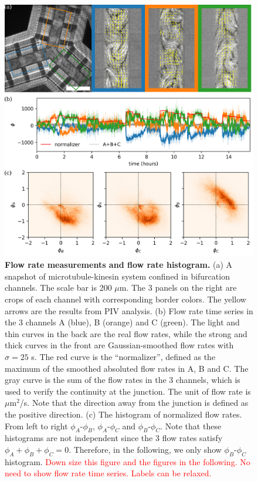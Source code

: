 \documentclass[%
10pt,
superscriptaddress,
twocolumn,
 amsmath,amssymb,
 aps,prx,
]{revtex4-2}
\begin{document}
\begin{figure}[!h]
    \includegraphics[width=\textwidth]{3-bifurcation-symmetric}
    \caption{
    \textbf{Flow rate measurements and flow rate histogram.}
    (a) A snapshot of microtubule-kinesin system confined in bifurcation channels.
    The scale bar is 200 $\mu$m.
    The 3 panels on the right are crops of each channel with corresponding border colors. 
    The yellow arrows are the results from PIV analysis. 
    (b) Flow rate time series in the 3 channels A (blue), B (orange) and C (green). 
    The light and thin curves in the back are the real flow rates, while the strong and thick curves in the front are Gaussian-smoothed flow rates with $\sigma=25$ s. 
    The red curve is the ``normalizer'', defined as the maximum of the   smoothed absoluted flow rates in A, B and C. 
    The gray curve is the sum of the flow rates in the 3 channels, which is used to verify the continuity at the junction.
    The unit of flow rate is $\mu$m$^2$/s.
    Note that the direction away from the junction is defined as the positive direction. 
    (c) The histogram of normalized flow rates. From left to right $\phi_A$-$\phi_B$, $\phi_A$-$\phi_C$ and $\phi_B$-$\phi_C$. Note that these histograms are not independent since the 3 flow rates satisfy $\phi_A+\phi_B+\phi_C = 0$. Therefore, in the following, we only show $\phi_B$-$\phi_C$ histogram.
    \textcolor{red}{Down size this figure and the figures in the following. No need to show flow rate time series. Labels can be relaxed.}
    }
    \label{fig:bifurcation-symmetric}
\end{figure}
\end{document}
